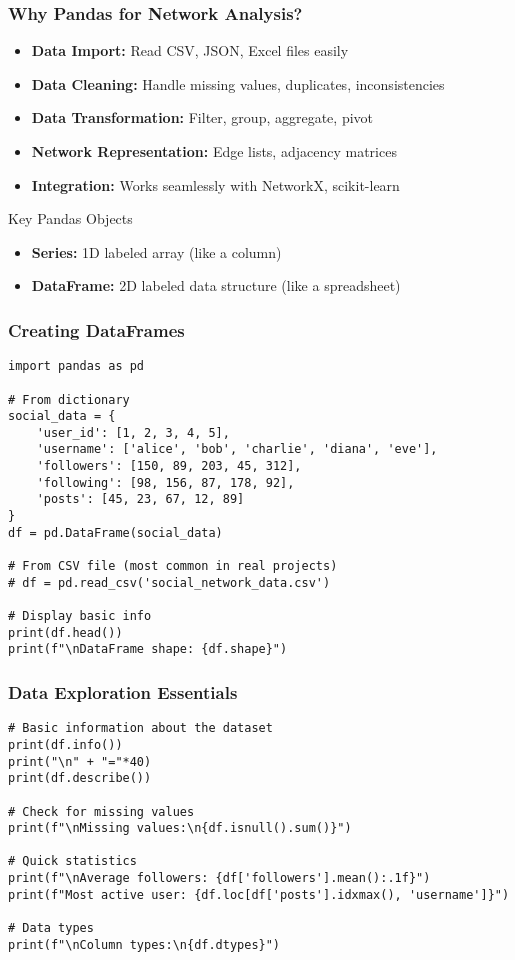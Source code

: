 \documentclass[aspectratio=169]{beamer}
\begin{document}
\begin{frame}
\frametitle{Why Pandas for Network Analysis?}
\begin{itemize}
    \item \textbf{Data Import:} Read CSV, JSON, Excel files easily
    \item \textbf{Data Cleaning:} Handle missing values, duplicates, inconsistencies
    \item \textbf{Data Transformation:} Filter, group, aggregate, pivot
    \item \textbf{Network Representation:} Edge lists, adjacency matrices
    \item \textbf{Integration:} Works seamlessly with NetworkX, scikit-learn
\end{itemize}

\vspace{1em}
\begin{block}{Key Pandas Objects}
\begin{itemize}
    \item \textbf{Series:} 1D labeled array (like a column)
    \item \textbf{DataFrame:} 2D labeled data structure (like a spreadsheet)
\end{itemize}
\end{block}
\end{frame}

\begin{frame}[fragile]
\frametitle{Creating DataFrames}
\begin{lstlisting}[caption=Different Ways to Create DataFrames]
import pandas as pd

# From dictionary
social_data = {
    'user_id': [1, 2, 3, 4, 5],
    'username': ['alice', 'bob', 'charlie', 'diana', 'eve'],
    'followers': [150, 89, 203, 45, 312],
    'following': [98, 156, 87, 178, 92],
    'posts': [45, 23, 67, 12, 89]
}
df = pd.DataFrame(social_data)

# From CSV file (most common in real projects)
# df = pd.read_csv('social_network_data.csv')

# Display basic info
print(df.head())
print(f"\nDataFrame shape: {df.shape}")
\end{lstlisting}
\end{frame}

\begin{frame}[fragile]
\frametitle{Data Exploration Essentials}
\begin{lstlisting}[caption=Quick Data Overview]
# Basic information about the dataset
print(df.info())
print("\n" + "="*40)
print(df.describe())

# Check for missing values
print(f"\nMissing values:\n{df.isnull().sum()}")

# Quick statistics
print(f"\nAverage followers: {df['followers'].mean():.1f}")
print(f"Most active user: {df.loc[df['posts'].idxmax(), 'username']}")

# Data types
print(f"\nColumn types:\n{df.dtypes}")
\end{lstlisting}
\end{frame}
\end{document}
